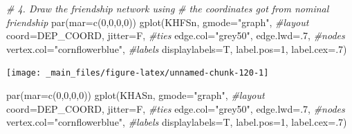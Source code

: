 \documentclass[
  notitlepage,
  onecolumn,
  openany]{book}
\newenvironment{Shaded}{\begin{snugshade}}{\end{snugshade}}
\newcommand{\AttributeTok}[1]{\textcolor[rgb]{0.77,0.63,0.00}{#1}}
\newcommand{\CommentTok}[1]{\textcolor[rgb]{0.56,0.35,0.01}{\textit{#1}}}
\newcommand{\DecValTok}[1]{\textcolor[rgb]{0.00,0.00,0.81}{#1}}
\newcommand{\FunctionTok}[1]{\textcolor[rgb]{0.00,0.00,0.00}{#1}}
\newcommand{\NormalTok}[1]{#1}
\newcommand{\StringTok}[1]{\textcolor[rgb]{0.31,0.60,0.02}{#1}}
\begin{document}
\begin{Shaded}
\begin{Highlighting}[]
\CommentTok{\# 4. Draw the friendship network using }
\CommentTok{\#    the coordinates got from nominal friendship}
\FunctionTok{par}\NormalTok{(}\AttributeTok{mar=}\FunctionTok{c}\NormalTok{(}\DecValTok{0}\NormalTok{,}\DecValTok{0}\NormalTok{,}\DecValTok{0}\NormalTok{,}\DecValTok{0}\NormalTok{))}
\FunctionTok{gplot}\NormalTok{(KHFSn,}
      \AttributeTok{gmode=}\StringTok{"graph"}\NormalTok{,}
      \CommentTok{\#layout}
      \AttributeTok{coord=}\NormalTok{DEP\_COORD,}
      \AttributeTok{jitter=}\NormalTok{F,}
      \CommentTok{\#ties}
      \AttributeTok{edge.col=}\StringTok{"grey50"}\NormalTok{,}
      \AttributeTok{edge.lwd=}\NormalTok{.}\DecValTok{7}\NormalTok{,}
      \CommentTok{\#nodes}
      \AttributeTok{vertex.col=}\StringTok{"cornflowerblue"}\NormalTok{,}
      \CommentTok{\#labels}
      \AttributeTok{displaylabels=}\NormalTok{T, }
      \AttributeTok{label.pos=}\DecValTok{1}\NormalTok{, }
      \AttributeTok{label.cex=}\NormalTok{.}\DecValTok{7}\NormalTok{)}
\end{Highlighting}
\end{Shaded}

\begin{center}\texttt{[image: \_main\_files/figure-latex/unnamed-chunk-120-1]} \end{center}

\begin{Shaded}
\begin{Highlighting}[]
\FunctionTok{par}\NormalTok{(}\AttributeTok{mar=}\FunctionTok{c}\NormalTok{(}\DecValTok{0}\NormalTok{,}\DecValTok{0}\NormalTok{,}\DecValTok{0}\NormalTok{,}\DecValTok{0}\NormalTok{))}
\FunctionTok{gplot}\NormalTok{(KHASn,}
      \AttributeTok{gmode=}\StringTok{"graph"}\NormalTok{,}
      \CommentTok{\#layout}
      \AttributeTok{coord=}\NormalTok{DEP\_COORD,}
      \AttributeTok{jitter=}\NormalTok{F,}
      \CommentTok{\#ties}
      \AttributeTok{edge.col=}\StringTok{"grey50"}\NormalTok{,}
      \AttributeTok{edge.lwd=}\NormalTok{.}\DecValTok{7}\NormalTok{,}
      \CommentTok{\#nodes}
      \AttributeTok{vertex.col=}\StringTok{"cornflowerblue"}\NormalTok{,}
      \CommentTok{\#labels}
      \AttributeTok{displaylabels=}\NormalTok{T, }
      \AttributeTok{label.pos=}\DecValTok{1}\NormalTok{, }
      \AttributeTok{label.cex=}\NormalTok{.}\DecValTok{7}\NormalTok{)}
\end{Highlighting}
\end{Shaded}
\end{document}
